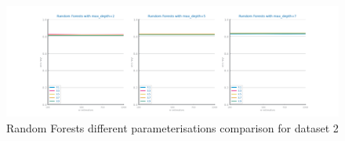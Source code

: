\documentclass[10pt]{extarticle}
\begin{document}
\begin{figure}[H]
\centering\includegraphics[scale=0.6]{images/dataset2/models_evaluation/Credit_Score_rf_accuracy_study.png}
\caption{Random Forests different parameterisations comparison for dataset 2}
\end{figure}
\end{document}
